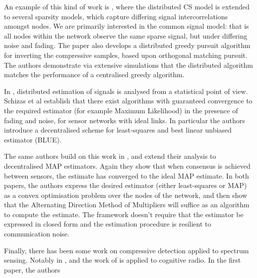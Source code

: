 An example of this kind of work is \cite{Sundman2013a}, where the distributed CS model is extended to several sparsity models, which capture differing signal intercorrelations amongst nodes. We are primarily interested in the common signal model: that is all nodes within the network observe the same sparse signal, but under differing noise and fading. The paper also develops a distributed greedy pursuit algorithm for inverting the compressive samples, based upon orthogonal matching pursuit. The authors demonstrate via extensive simulations that the distributed algorithm matches the performance of a centralised greedy algorithm. 

In \cite{schizas2008consensus}, distributed estimation of signals is analysed from a statistical point of view. Schizas et al establish that there exist algorithms with guaranteed convergence to the required estimator (for example Maximum Likelihood) in the presence of fading and noise, for sensor networks with ideal links. In particular the authors introduce a decentralised scheme for least-squares and best linear unbiased estimator (BLUE). 

The same authors build on this work in \cite{schizas2008consensus2}, and extend their analysis to decentralised MAP estimators. Again they show that when consensus is achieved between sensors, the estimate has converged to the ideal MAP estimate. In both papers, the authors express the desired estimator (either least-squares or MAP) as a convex optimisation problem over the nodes of the network, and then show that the Alternating Direction Method of Multipliers will suffice as an algorithm to compute the estimate. The framework doesn't require that the estimator be expressed in closed form and the estimation procedure is resilient to communication noise.

Finally, there has been some work on compressive detection applied to spectrum sensing. Notably in  \cite{verlant2012multiband}, and \cite{bodart2015multiband} the work of \cite{Davenport2010} is applied to cognitive radio. In the first paper, the authors